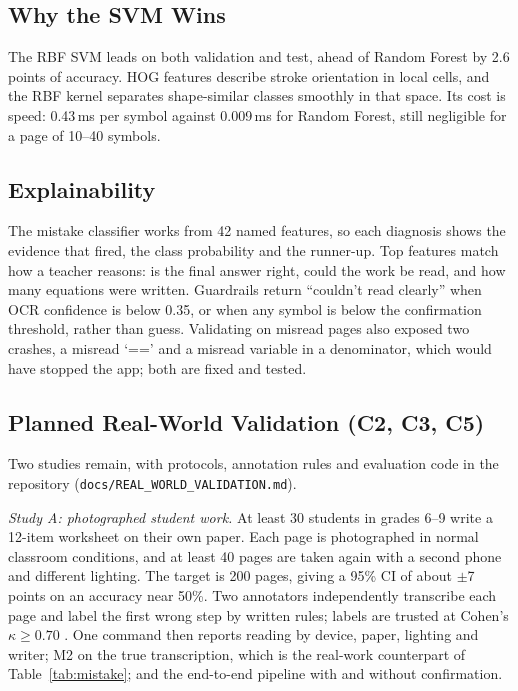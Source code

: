 \documentclass[conference]{IEEEtran}
\begin{document}
\subsection{Why the SVM Wins}
The RBF SVM leads on both validation and test, ahead of Random Forest by 2.6 points of accuracy. HOG features describe stroke orientation in local cells, and the RBF kernel separates shape-similar classes smoothly in that space. Its cost is speed: 0.43\,ms per symbol against 0.009\,ms for Random Forest, still negligible for a page of 10--40 symbols.

\subsection{Explainability}
The mistake classifier works from 42 named features, so each diagnosis shows the evidence that fired, the class probability and the runner-up. Top features match how a teacher reasons: is the final answer right, could the work be read, and how many equations were written. Guardrails return ``couldn't read clearly'' when OCR confidence is below 0.35, or when any symbol is below the confirmation threshold, rather than guess. Validating on misread pages also exposed two crashes, a misread `==' and a misread variable in a denominator, which would have stopped the app; both are fixed and tested.

\subsection{Planned Real-World Validation (C2, C3, C5)}
Two studies remain, with protocols, annotation rules and evaluation code in the repository (\texttt{docs/REAL\_WORLD\_VALIDATION.md}).

\textit{Study A: photographed student work.} At least 30 students in grades 6--9 write a 12-item worksheet on their own paper. Each page is photographed in normal classroom conditions, and at least 40 pages are taken again with a second phone and different lighting. The target is 200 pages, giving a 95\% CI of about $\pm$7 points on an accuracy near 50\%. Two annotators independently transcribe each page and label the first wrong step by written rules; labels are trusted at Cohen's $\kappa \geq 0.70$ \cite{kappa}. One command then reports reading by device, paper, lighting and writer; M2 on the true transcription, which is the real-work counterpart of Table~\ref{tab:mistake}; and the end-to-end pipeline with and without confirmation.
\end{document}
